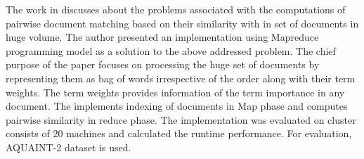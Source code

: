 \par The work in  \cite{elsayed2008pairwise} discusses about the problems associated with the computations of pairwise document matching based on their similarity with in set of documents in huge volume. The author presented an implementation using Mapreduce programming model as a solution to the above addressed problem. The chief purpose of the paper focuses on processing the huge set of documents by representing them as bag of words irrespective of the order along with their term weights. The term weights provides information of the term importance in any document. The implements indexing of documents in Map phase and computes pairwise similarity in reduce phase. The implementation was evaluated on cluster consists of 20 machines and calculated the runtime performance. For evaluation, AQUAINT-2 dataset is used. 







